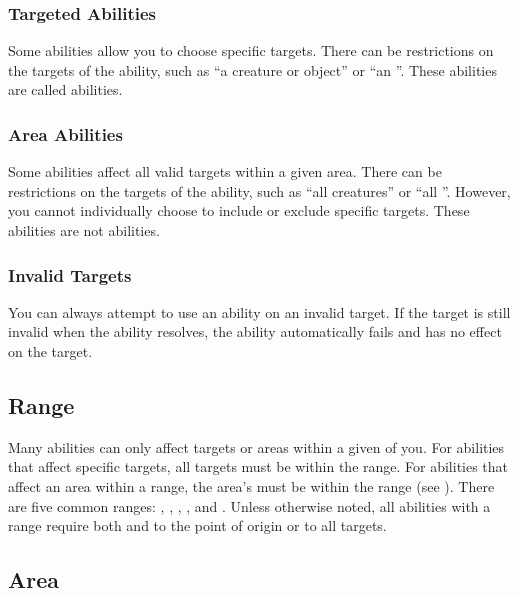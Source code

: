         \subsubsection{Targeted Abilities}\label{Targeted Abilities}
            Some abilities allow you to choose specific targets.
            There can be restrictions on the targets of the ability, such as ``a creature or object'' or ``an ''.
            These abilities are called  abilities.

        \subsubsection{Area Abilities}
            Some abilities affect all valid targets within a given area.
            There can be restrictions on the targets of the ability, such as ``all creatures'' or ``all ''.
            However, you cannot individually choose to include or exclude specific targets.
            These abilities are not  abilities.

        \subsubsection{Invalid Targets}
            You can always attempt to use an ability on an invalid target.
            If the target is still invalid when the ability resolves, the ability automatically fails and has no effect on the target.

    \subsection{Range}\label{Range}
        Many abilities can only affect targets or areas within a given  of you.
        For abilities that affect specific targets, all targets must be within the range.
        For abilities that affect an area within a range, the area's  must be within the range (see ).
        There are five common ranges: \rngshort, \rngmed, \rnglong, \rngdist, and \rngext.
        Unless otherwise noted, all abilities with a range require both  and  to the point of origin or to all targets.

    \subsection{Area}\label{Area}

